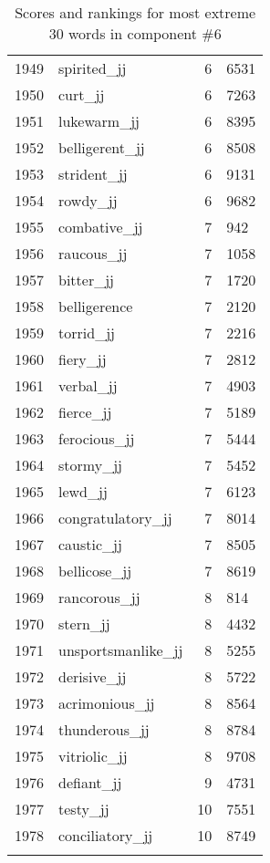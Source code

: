 \begin{longtable}[!htbp]{| rlr@{.}l |}
    1949 & spirited\_jj & 6 & 6531 \\
    1950 & curt\_jj & 6 & 7263 \\
    1951 & lukewarm\_jj & 6 & 8395 \\
    1952 & belligerent\_jj & 6 & 8508 \\
    1953 & strident\_jj & 6 & 9131 \\
    1954 & rowdy\_jj & 6 & 9682 \\
    1955 & combative\_jj & 7 & 942 \\
    1956 & raucous\_jj & 7 & 1058 \\
    1957 & bitter\_jj & 7 & 1720 \\
    1958 & belligerence & 7 & 2120 \\
    1959 & torrid\_jj & 7 & 2216 \\
    1960 & fiery\_jj & 7 & 2812 \\
    1961 & verbal\_jj & 7 & 4903 \\
    1962 & fierce\_jj & 7 & 5189 \\
    1963 & ferocious\_jj & 7 & 5444 \\
    1964 & stormy\_jj & 7 & 5452 \\
    1965 & lewd\_jj & 7 & 6123 \\
    1966 & congratulatory\_jj & 7 & 8014 \\
    1967 & caustic\_jj & 7 & 8505 \\
    1968 & bellicose\_jj & 7 & 8619 \\
    1969 & rancorous\_jj & 8 & 814 \\
    1970 & stern\_jj & 8 & 4432 \\
    1971 & unsportsmanlike\_jj & 8 & 5255 \\
    1972 & derisive\_jj & 8 & 5722 \\
    1973 & acrimonious\_jj & 8 & 8564 \\
    1974 & thunderous\_jj & 8 & 8784 \\
    1975 & vitriolic\_jj & 8 & 9708 \\
    1976 & defiant\_jj & 9 & 4731 \\
    1977 & testy\_jj & 10 & 7551 \\
    1978 & conciliatory\_jj & 10 & 8749 \\
    \hline
    \caption{Scores and rankings for most extreme 30 words in component \#6} \\
\end{longtable}
